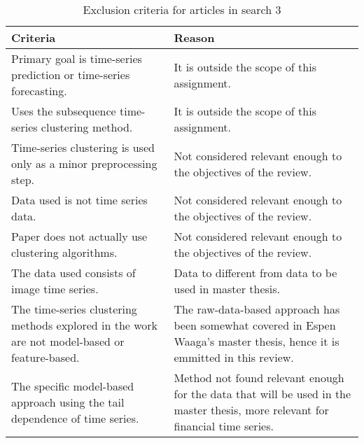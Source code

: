 \begin{table*}
    \centering
    \begin{tabular}{p{}p{}}
        \toprule
        Criteria                                                                                      & Reason \\
        \midrule
        Primary goal is time-series prediction or time-series forecasting.                            & It is outside the scope of this assignment.\\
        Uses the subsequence time-series clustering method.                                           & It is outside the scope of this assignment.\\
        Time-series clustering is used only as a minor preprocessing step.                            & Not considered relevant enough to the objectives of the review.\\
        Data used is not time series data.                                                            & Not considered relevant enough to the objectives of the review.\\
        Paper does not actually use clustering algorithms.                                            & Not considered relevant enough to the objectives of the review.\\
        The data used consists of image time series.                                                  & Data to different from data to be used in master thesis.\\
        The time-series clustering methods explored in the work are not model-based or feature-based. & The raw-data-based approach has been somewhat covered in Espen Waaga's master thesis, hence it is emmitted in this review.\\
        The specific model-based approach using the tail dependence of time series.                   & Method not found relevant enough for the data that will be used in the master thesis, more relevant for financial time series.\\
        \bottomrule
    \end{tabular}
    \caption{Exclusion criteria for articles in search 3}
    \label{tab:excl_crit}
\end{table*}
